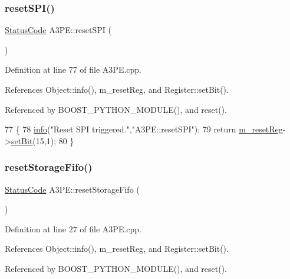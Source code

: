 \subsubsection{\texorpdfstring{reset\+S\+P\+I()}{resetSPI()}}
{\footnotesize\ttfamily \hyperlink{classStatusCode}{Status\+Code} A3\+P\+E\+::reset\+S\+PI (\begin{DoxyParamCaption}{ }\end{DoxyParamCaption})}



Definition at line 77 of file A3\+P\+E.\+cpp.



References Object\+::info(), m\+\_\+reset\+Reg, and Register\+::set\+Bit().



Referenced by B\+O\+O\+S\+T\+\_\+\+P\+Y\+T\+H\+O\+N\+\_\+\+M\+O\+D\+U\+L\+E(), and reset().


\begin{DoxyCode}
77                          \{
78   \hyperlink{classObject_a644fd329ea4cb85f54fa6846484b84a8}{info}(\textcolor{stringliteral}{"Reset SPI triggered."},\textcolor{stringliteral}{"A3PE::resetSPI"});
79   \textcolor{keywordflow}{return} \hyperlink{classA3PE_ab4db5f00976e5095686f108c8febf702}{m\_resetReg}->\hyperlink{classRegister_ab094246dd12aa7e0aa0ca917f4e70b31}{setBit}(15,1);
80 \}
\end{DoxyCode}
\mbox{\label{classA3PE_a8e7074703227b118aa9230258f22b44c}} 
\subsubsection{\texorpdfstring{reset\+Storage\+Fifo()}{resetStorageFifo()}}
{\footnotesize\ttfamily \hyperlink{classStatusCode}{Status\+Code} A3\+P\+E\+::reset\+Storage\+Fifo (\begin{DoxyParamCaption}{ }\end{DoxyParamCaption})}



Definition at line 27 of file A3\+P\+E.\+cpp.



References Object\+::info(), m\+\_\+reset\+Reg, and Register\+::set\+Bit().



Referenced by B\+O\+O\+S\+T\+\_\+\+P\+Y\+T\+H\+O\+N\+\_\+\+M\+O\+D\+U\+L\+E(), and reset().


